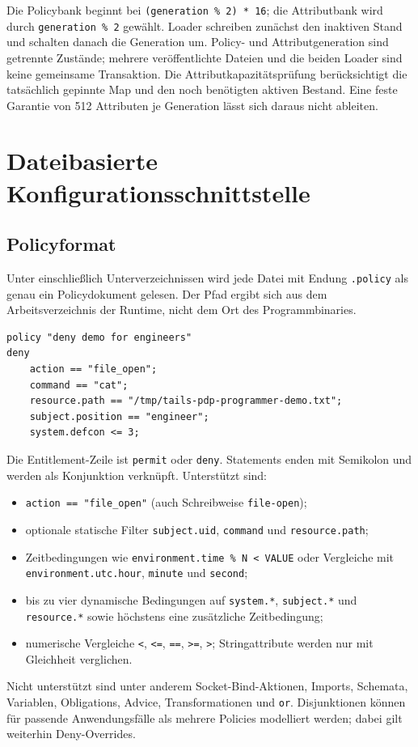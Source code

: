 \documentclass[12pt,a4paper]{article}
\begin{document}
Die Policybank beginnt bei
\texttt{(generation \% 2) * 16}; die Attributbank wird durch
\texttt{generation \% 2} gewählt. Loader schreiben zunächst den inaktiven Stand
und schalten danach die Generation um. Policy- und Attributgeneration sind
getrennte Zustände; mehrere veröffentlichte Dateien und die beiden Loader sind
keine gemeinsame Transaktion. Die Attributkapazitätsprüfung berücksichtigt
die tatsächlich gepinnte Map und den noch benötigten aktiven Bestand. Eine feste
Garantie von 512 Attributen je Generation lässt sich daraus nicht ableiten.

\section{Dateibasierte Konfigurationsschnittstelle}
\subsection{Policyformat}
Unter  einschließlich Unterverzeichnissen wird jede Datei mit
Endung \texttt{.policy} als genau ein Policydokument gelesen. Der Pfad ergibt
sich aus dem Arbeitsverzeichnis der Runtime, nicht dem Ort des Programmbinaries.
\begin{lstlisting}
policy "deny demo for engineers"
deny
    action == "file_open";
    command == "cat";
    resource.path == "/tmp/tails-pdp-programmer-demo.txt";
    subject.position == "engineer";
    system.defcon <= 3;
\end{lstlisting}
Die Entitlement-Zeile ist \texttt{permit} oder \texttt{deny}. Statements enden mit
Semikolon und werden als Konjunktion verknüpft. Unterstützt sind:
\begin{itemize}[nosep]
  \item \texttt{action == "file\_open"} (auch Schreibweise \texttt{file-open});
  \item optionale statische Filter \texttt{subject.uid}, \texttt{command} und \texttt{resource.path};
  \item Zeitbedingungen wie \texttt{environment.time \% N < VALUE} oder
    Vergleiche mit \texttt{environment.utc.hour}, \texttt{minute} und \texttt{second};
  \item bis zu vier dynamische Bedingungen auf \texttt{system.*}, \texttt{subject.*}
    und \texttt{resource.*} sowie höchstens eine zusätzliche Zeitbedingung;
  \item numerische Vergleiche \texttt{<}, \texttt{<=}, \texttt{==}, \texttt{>=},
    \texttt{>}; Stringattribute werden nur mit Gleichheit verglichen.
\end{itemize}
Nicht unterstützt sind unter anderem Socket-Bind-Aktionen, Imports, Schemata,
Variablen, Obligations, Advice, Transformationen und \texttt{or}.
Disjunktionen können für passende Anwendungsfälle als mehrere Policies
modelliert werden; dabei gilt weiterhin Deny-Overrides.
\end{document}
